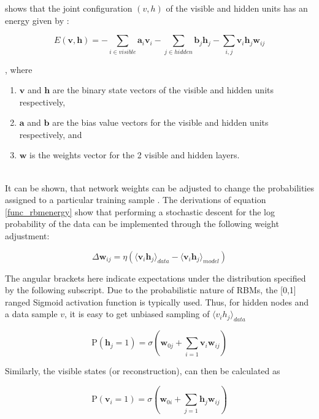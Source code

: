 \documentclass[a4paper,11pt,oneside]{article}
\theoremstyle{plain}
\theoremstyle{definition}
\begin{document}
	\citet{Hinton5} shows that the joint configuration $(v,h)$ of the visible and hidden units has an energy given by :
	
	\begin{equation}\label{func_rbmenergy}
	E(\mathbf{v},\mathbf{h}) = - \sum_{i \in visible} \mathbf{a}_i\mathbf{v}_i - \sum_{j \in hidden} \mathbf{b}_j\mathbf{h}_j - \sum_{i,j}\mathbf{v}_i\mathbf{h}_j\mathbf{w}_{ij}
	\end{equation}
	
	, where
	\begin{enumerate}
		\item $\mathbf{v}$ and $\mathbf{h}$ are the binary state vectors of the visible and hidden units respectively, 
		\item $\mathbf{a}$ and $\mathbf{b}$ are the bias value vectors for the visible and hidden units respectively, and
		\item $\mathbf{w}$ is the weights vector for the 2 visible and hidden layers.
	\end{enumerate}
	~\\
	It can be shown, that network weights can be adjusted to change the probabilities assigned to a particular training sample . The derivations of equation \eqref{func_rbmenergy} show that performing a stochastic descent for the log probability of the data can be implemented through the following weight adjustment:
	
	\begin{equation}
	\Delta \mathbf{w}_{ij} = \eta (\langle \mathbf{v}_i\mathbf{h}_j\rangle_{data} - \langle \mathbf{v}_i\mathbf{h}_j\rangle_{model})
	\end{equation}
	
	The angular brackets here indicate expectations under the distribution specified by the following subscript. Due to the probabilistic nature of RBMs, the [0,1] ranged Sigmoid activation function is typically used. Thus, for hidden nodes and a data sample $v$, it is easy to get unbiased sampling of $\langle v_ih_j \rangle_{data}$
	
	\begin{equation}
	\mathrm{P}(\mathbf{h}_j=1) = \sigma(\mathbf{w}_{0j} +  \sum_{i=1}\mathbf{v}_i\mathbf{w}_{ij})
	\end{equation}
	
	Similarly, the visible states (or reconstruction), can then be calculated as 
	
	\begin{equation}
	\mathrm{P}(\mathbf{v}_i=1) = \sigma(\mathbf{w}_{0i} + \sum_{j=1}\mathbf{h}_j\mathbf{w}_{ij})
	\end{equation}
	
\end{document}
